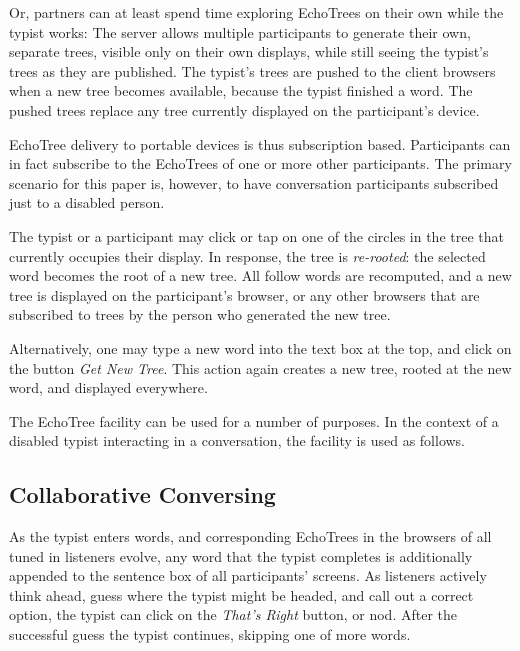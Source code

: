 \documentclass{sigchi}
\begin{document}
Or, partners can at least spend time exploring EchoTrees on their own
while the typist works: The server allows multiple participants to
generate their own, separate trees, visible only on their own
displays, while still seeing the typist's trees as they are
published. The typist's trees are pushed to the client browsers when a
new tree becomes available, because the typist finished a word. The
pushed trees replace any tree currently displayed on the participant's
device.

EchoTree delivery to portable devices is thus subscription
based. Participants can in fact subscribe to the EchoTrees of one or
more other participants. The primary scenario for this paper is,
however, to have conversation participants subscribed just to a
disabled person.

The typist or a participant may click or tap on one of the circles in
the tree that currently occupies their display. In response, the tree
is {\em re-rooted}: the selected word becomes the root of a new
tree. All follow words are recomputed, and a new tree is displayed on
the participant's browser, or any other browsers that are subscribed
to trees by the person who generated the new tree.

Alternatively, one may type a new word into the text box at the top,
and click on the button {\em Get New Tree}. This action again creates
a new tree, rooted at the new word, and displayed everywhere.

The EchoTree facility can be used for a number of purposes. In the
context of a disabled typist interacting in a conversation, the
facility is used as follows.

\subsection{Collaborative Conversing}
As the typist enters words, and corresponding EchoTrees in the
browsers of all tuned in listeners evolve, any word that the typist
completes is additionally appended to the sentence box of all
participants' screens. As listeners actively think ahead, guess where
the typist might be headed, and call out a correct option, the typist
can click on the {\em That's Right} button, or nod. After the
successful guess the typist continues, skipping one of more words.
\end{document}
